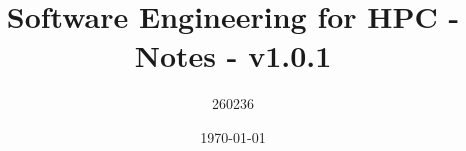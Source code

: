 \author{260236}
\title{Software Engineering for HPC - Notes - v1.0.1}
\date{\printdayoff\today}
\maketitle